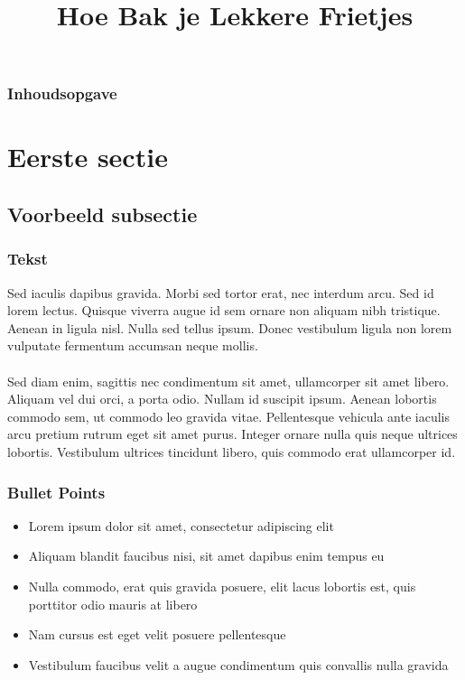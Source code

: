 \documentclass[aspectratio=43]{uva-inf-presentation}
\title{Hoe Bak je Lekkere Frietjes}
\begin{document}
\begin{titelframe}
\titlepage
\end{titelframe}

\begin{frame}
\frametitle{Inhoudsopgave}
\tableofcontents
\end{frame}


\section{Eerste sectie}
\subsection{Voorbeeld subsectie}

\begin{frame}
\frametitle{Tekst}
Sed iaculis dapibus gravida. Morbi sed tortor erat, nec interdum arcu. Sed id
lorem lectus. Quisque viverra augue id sem ornare non aliquam nibh tristique.
Aenean in ligula nisl. Nulla sed tellus ipsum. Donec vestibulum ligula non lorem
vulputate fermentum accumsan neque mollis.\\~\\

Sed diam enim, sagittis nec condimentum sit amet, ullamcorper sit amet libero.
Aliquam vel dui orci, a porta odio. Nullam id suscipit ipsum. Aenean lobortis
commodo sem, ut commodo leo gravida vitae. Pellentesque vehicula ante iaculis
arcu pretium rutrum eget sit amet purus. Integer ornare nulla quis neque
ultrices lobortis. Vestibulum ultrices tincidunt libero, quis commodo erat
ullamcorper id. \end{frame}


\begin{frame}
\frametitle{Bullet Points}
\begin{itemize}
\item Lorem ipsum dolor sit amet, consectetur adipiscing elit
\item Aliquam blandit faucibus nisi, sit amet dapibus enim tempus eu
\item Nulla commodo, erat quis gravida posuere, elit lacus lobortis est, quis
      porttitor odio mauris at libero
\item Nam cursus est eget velit posuere pellentesque
\item Vestibulum faucibus velit a augue condimentum quis convallis nulla gravida
\end{itemize}
\end{frame}
\end{document}
